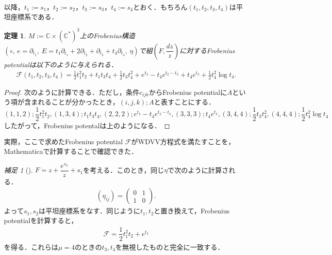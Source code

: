 \documentclass[a4paper,11pt]{jbook}
\theoremstyle{plain}
\newtheorem{thm}{定理}[section]
\theoremstyle{definition}
\theoremstyle{remark}
\theoremstyle{proof}
\newtheorem*{comp}{補足}
\numberwithin{equation}{section}
\def\CC{{\mathbb C}}
\def\F{{\mathcal F}}
\begin{document}
\noindent 以降，$t_1:=s_1$，$t_2:=s_2$，$t_3:=s_3$，$t_4:=s_4$とおく．もちろん$(t_1,t_2,t_3,t_4)$は平坦座標系である．

\begin{thm}\rm
$M:=\CC\times(\CC^*)^3$上の\rm{Frobenius構造}$(\circ, \ e=\partial_{t_1}, \ E=t_1\partial_{t_1}+2\partial_{t_2}+\partial_{t_3}+t_4\partial_{t_4},\ \eta)$で組$\left(F,\dfrac{dz}{z}\right)$に対するFrobenius potentialは以下のように与えられる．
\begin{align}
	\F(t_1,t_2,t_3,t_4)=\frac{1}{2}t_1^2t_2+t_1t_3t_4+\frac{1}{2}t_3t_4^2+e^{t_2}-t_4e^{t_2-t_3}+t_4e^{t_3}+\frac{1}{2}t_4^2\log{t_4}.
\end{align}
\end{thm} 

\begin{proof}%
次のように計算できる．ただし，条件$c_{ijk}$からFrobenius potentialに$A$という項が含まれることが分かったとき，$(i,j,k);A$と表すことにする．\\
$(1,1,2) ; \dfrac{1}{2}t_1^2t_2, (1,3,4) ; t_1t_3t_4, (2,2,2);e^{t_2}-t_4e^{t_2-t_3}, (3,3,3) ; t_4e^{t_3}, (3,4,4) ; \dfrac{1}{2}t_3t_4^2, (4,4,4) ; \dfrac{1}{2}t_4^2\log{t_4}$ \\
したがって，Frobenius potentalは上のようになる．
\end{proof}

実際，ここで求めたFrobenius potential $\F$がWDVV方程式を満たすことを，Mathematicaで計算することで確認できた．

\begin{comp}[\cite{tak:1}]\rm
	$F=z+\dfrac{e^{s_2}}{z}+s_1$を考える．このとき，同じ$\eta$で次のように計算される．
\begin{align*}
	(\eta_{ij})=
	\begin{pmatrix}
	0 & 1 \\
	1 & 0
	\end{pmatrix}.
\end{align*}
よって$s_1, s_2$は平坦座標系をなす．同じように$t_1, t_2$と置き換えて，Frobenius potentialを計算すると，
\begin{align*}
	\F=\dfrac{1}{2}t_1^2t_2+e^{t_2}
\end{align*}
を得る．これらは$\mu=4$のときの$t_3, t_4$を無視したものと完全に一致する．
\end{comp}
\end{document}
